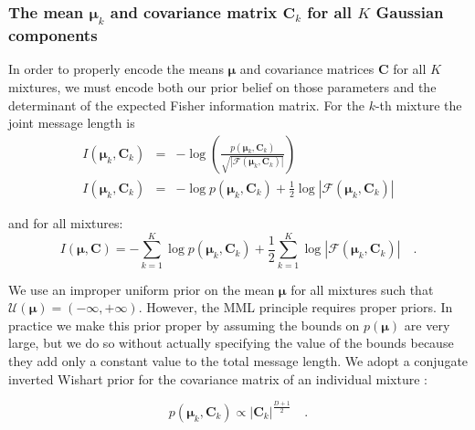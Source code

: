\documentclass{elsarticle}
\newcommand{\vect}[1]{\boldsymbol{\mathbf{#1}}}
\def\cov{C}
\def\veccov{\vect{\cov}}
\def\vecmean{\vect{\mu}}
\newcommand{\fisher}[1]{\mathcal{F}\left(#1\right)}
\newcommand{\detfisher}[1]{\left|\fisher{#1}\right|}
\newcommand{\prior}[1]{p\left(#1\right)}
\begin{document}
\subsubsection{The mean $\vecmean_k$ and covariance matrix $\veccov_k$ for all
               $K$ Gaussian components}

In order to properly encode the means $\vecmean$ and covariance matrices
$\veccov$ for all $K$ mixtures, we must encode both our prior belief on 
those parameters and the determinant of the expected Fisher information 
matrix. For the $k$-th mixture the joint message length is
\begin{eqnarray}
  I(\vecmean_k,\veccov_k) &=& -\log{\left(\frac{\prior{{\vecmean_k,\veccov_k}}}{\sqrt{\detfisher{{\vecmean_k,\veccov_k}}}}\right)} \nonumber \\ 
  I(\vecmean_k,\veccov_k) &=& -\log{\prior{{\vecmean_k,\veccov_k}}} + \frac{1}{2}\log{\detfisher{{\vecmean_k,\veccov_k}}}
\end{eqnarray}

\noindent{}and for all mixtures:
\begin{equation}
  I(\vecmean,\veccov) = -\sum_{k=1}^{K}\log{\prior{{\vecmean_k,\veccov_k}}} + \frac{1}{2}\sum_{k=1}^{K}\log{\detfisher{{\vecmean_k,\veccov_k}}} \quad .
  \label{eq:I_component_params}
\end{equation}

We use an improper uniform prior on the mean $\vecmean$ for all mixtures such
that 
    $\mathcal{U}(\vecmean) = (-\infty, +\infty)$.
However,  the MML principle requires proper priors. In practice we make 
this prior proper by assuming the bounds on $\prior{\vecmean}$ are very large, but 
we do so without actually specifying the value of the bounds because they add 
only a constant value to the total message length.
We adopt a conjugate inverted Wishart prior for the covariance matrix of an
individual mixture \cite[Section 5.2.3 of][]{Schafer_1997}:

\begin{equation}
  \prior{{\vecmean_k, \veccov_k}} \propto |\veccov_k|^{\frac{D+1}{2}} \quad .
  \label{eq:covariance-prior}
\end{equation}
\end{document}
